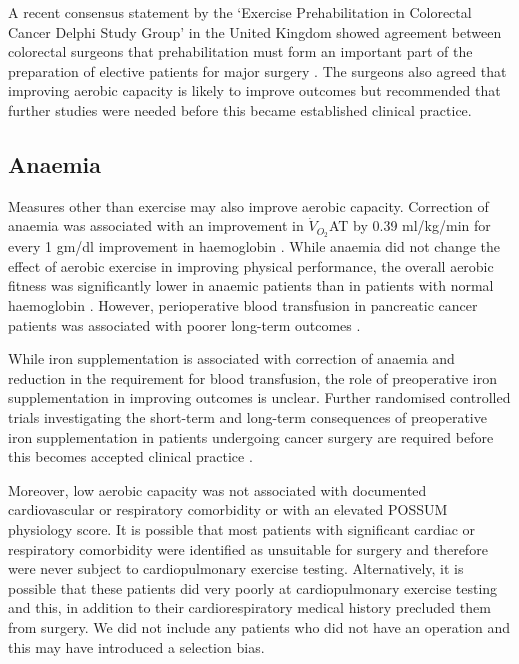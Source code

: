 A recent consensus statement by the `Exercise Prehabilitation in Colorectal Cancer Delphi Study Group' in the United Kingdom showed agreement between colorectal surgeons that prehabilitation must form an important part of the preparation of elective patients for major surgery \parencite{boereboom_forming_2015}. 
The surgeons also agreed that improving aerobic capacity is likely to improve outcomes but recommended that further studies were needed before this became established clinical practice.

\subsection{Anaemia}

Measures other than exercise may also improve aerobic capacity. 
Correction of anaemia was associated with an improvement in $\dot{V}_{O_2}$AT by 0.39 ml/kg/min for every 1 gm/dl improvement in haemoglobin \parencite{wright_cardiopulmonary_2014}. 
While anaemia did not change the effect of aerobic exercise in improving physical performance, the overall aerobic fitness was significantly lower in anaemic patients than in patients with normal haemoglobin \parencite{bellotto_anemia_2011}.
However, perioperative blood transfusion in pancreatic cancer patients was associated with poorer long-term outcomes \parencite{kneuertz_effects_2011, sutton_perioperative_2014}.

While iron supplementation is associated with correction of anaemia and reduction in the requirement for blood transfusion, the role of preoperative iron supplementation in improving outcomes is unclear. 
Further randomised controlled trials investigating the short-term and long-term consequences of preoperative iron supplementation in patients undergoing cancer surgery are required before this becomes accepted clinical practice \parencite{beris_perioperative_2008,hallet_impact_2014}.

Moreover, low aerobic capacity was not associated with documented cardiovascular or respiratory comorbidity or with an elevated POSSUM physiology score.
It is possible that most patients with significant cardiac or respiratory comorbidity were identified as unsuitable for surgery and therefore were never subject to cardiopulmonary exercise testing. 
Alternatively, it is possible that these patients did very poorly at cardiopulmonary exercise testing and this, in addition to their cardiorespiratory medical history precluded them from surgery.
We did not include any patients who did not have an operation and this may have introduced a selection bias.

